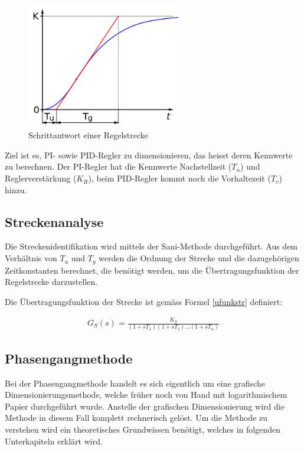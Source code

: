 \begin{figure}[h]
\centering
\includegraphics[width=0.6\textwidth]{Schrittantwort.png}
\caption{Schrittantwort einer Regelstrecke}
\label{schrittantwort}
\end{figure}

Ziel ist es, PI- sowie PID-Regler zu dimensionieren, das heisst deren Kennwerte zu berechnen. Der PI-Regler hat die Kennwerte Nachstellzeit ($T_n$) und Reglerverstärkung ($K_R$), beim PID-Regler kommt noch die Vorhaltezeit ($T_v$) hinzu.



\subsection{Streckenanalyse}
Die Streckenidentifikation wird mittels der Sani-Methode durchgeführt. Aus dem Verhältnis von $T_u$ und $T_g$ werden die Ordnung der Strecke und die dazugehörigen Zeitkonstanten berechnet, die benötigt werden, um die Übertragungsfunktion der Regelstrecke darzustellen. \newline 


Die Übertragungsfunktion der Strecke ist gemäss Formel \ref{ufunkstr} definiert:

\begin{align}
G_S(s)=\frac{K_S}{(1+sT_1)(1+sT_2)...(1+sT_n)}
\label{ufunkstr}
\end{align}

\newpage
\subsection{Phasengangmethode}
Bei der Phasengangmethode handelt es sich eigentlich um eine grafische Dimensionierungsmethode, welche früher noch von Hand mit logarithmischem Papier durchgeführt wurde. Anstelle der grafischen Dimensionierung wird die Methode in diesem Fall komplett rechnerisch gelöst. Um die Methode zu verstehen wird ein theoretisches Grundwissen benötigt, welches in folgenden Unterkapiteln erklärt wird.


